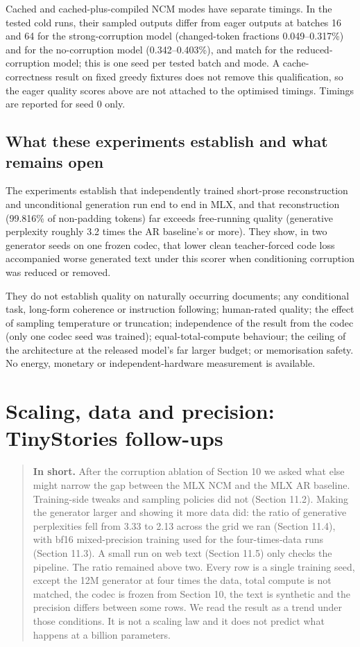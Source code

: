 \documentclass[
  british,
]{article}
\begin{document}
Cached and cached-plus-compiled NCM modes have separate timings. In the
tested cold runs, their sampled outputs differ from eager outputs at
batches 16 and 64 for the strong-corruption model (changed-token
fractions 0.049--0.317\%) and for the no-corruption model
(0.342--0.403\%), and match for the reduced-corruption model; this is
one seed per tested batch and mode. A cache-correctness result on fixed
greedy fixtures does not remove this qualification, so the eager quality
scores above are not attached to the optimised timings. Timings are
reported for seed 0 only.

\subsection{What these experiments establish and what remains
open}\label{what-these-experiments-establish-and-what-remains-open}

The experiments establish that independently trained short-prose
reconstruction and unconditional generation run end to end in MLX, and
that reconstruction (99.816\% of non-padding tokens) far exceeds
free-running quality (generative perplexity roughly 3.2 times the AR
baseline's or more). They show, in two generator seeds on one frozen
codec, that lower clean teacher-forced code loss accompanied worse
generated text under this scorer when conditioning corruption was
reduced or removed.

They do not establish quality on naturally occurring documents; any
conditional task, long-form coherence or instruction following;
human-rated quality; the effect of sampling temperature or truncation;
independence of the result from the codec (only one codec seed was
trained); equal-total-compute behaviour; the ceiling of the architecture
at the released model's far larger budget; or memorisation safety. No
energy, monetary or independent-hardware measurement is available.

\section{Scaling, data and precision: TinyStories
follow-ups}\label{scaling-data-and-precision-tinystories-follow-ups}

\begin{quote}
\textbf{In short.} After the corruption ablation of Section 10 we asked
what else might narrow the gap between the MLX NCM and the MLX AR
baseline. Training-side tweaks and sampling policies did not (Section
11.2). Making the generator larger and showing it more data did: the
ratio of generative perplexities fell from 3.33 to 2.13 across the grid
we ran (Section 11.4), with bf16 mixed-precision training used for the
four-times-data runs (Section 11.3). A small run on web text (Section
11.5) only checks the pipeline. The ratio remained above two. Every row
is a single training seed, except the 12M generator at four times the
data, total compute is not matched, the codec is frozen from Section 10,
the text is synthetic and the precision differs between some rows. We
read the result as a trend under those conditions. It is not a scaling
law and it does not predict what happens at a billion parameters.
\end{quote}
\end{document}
